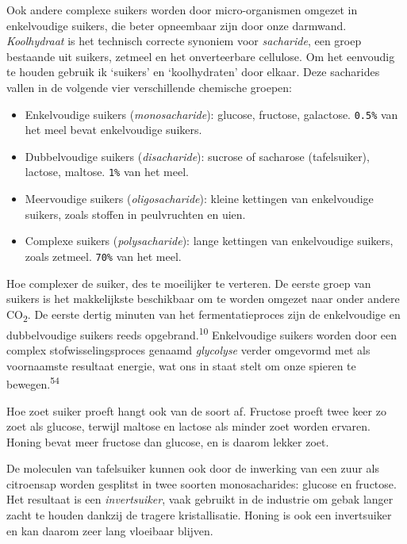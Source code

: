 \documentclass[
  11pt,
  dutch,
]{memoir}
\providecommand{\tightlist}{%
  \setlength{\itemsep}{0pt}\setlength{\parskip}{0pt}}
\begin{document}
Ook andere complexe suikers worden door micro-organismen omgezet in
enkelvoudige suikers, die beter opneembaar zijn door onze darmwand.
\emph{Koolhydraat} is het technisch correcte synoniem voor
\emph{sacharide}, een groep bestaande uit suikers, zetmeel en het
onverteerbare cellulose. Om het eenvoudig te houden gebruik ik `suikers'
en `koolhydraten' door elkaar. Deze sacharides vallen in de volgende
vier verschillende chemische groepen:

\label{microbio:suikers}

\begin{itemize}
\tightlist
\item
  Enkelvoudige suikers (\emph{monosacharide}): glucose, fructose,
  galactose. \texttt{0.5\%} van het meel bevat enkelvoudige suikers.
\item
  Dubbelvoudige suikers (\emph{disacharide}): sucrose of sacharose
  (tafelsuiker), lactose, maltose. \texttt{1\%} van het meel.
\item
  Meervoudige suikers (\emph{oligosacharide}): kleine kettingen van
  enkelvoudige suikers, zoals stoffen in peulvruchten en uien.
\item
  Complexe suikers (\emph{polysacharide}): lange kettingen van
  enkelvoudige suikers, zoals zetmeel. \texttt{70\%} van het meel.
\end{itemize}

Hoe complexer de suiker, des te moeilijker te verteren. De eerste groep
van suikers is het makkelijkste beschikbaar om te worden omgezet naar
onder andere CO\textsubscript{2}. De eerste dertig minuten van het
fermentatieproces zijn de enkelvoudige en dubbelvoudige suikers reeds
opgebrand.\textsuperscript{10} Enkelvoudige suikers worden door een
complex stofwisselingsproces genaamd \emph{glycolyse} verder omgevormd
met als voornaamste resultaat energie, wat ons in staat stelt om onze
spieren te bewegen.\textsuperscript{54}

Hoe zoet suiker proeft hangt ook van de soort af. Fructose proeft twee
keer zo zoet als glucose, terwijl maltose en lactose als minder zoet
worden ervaren. Honing bevat meer fructose dan glucose, en is daarom
lekker zoet.

De moleculen van tafelsuiker kunnen ook door de inwerking van een zuur
als citroensap worden gesplitst in twee soorten monosacharides: glucose
en fructose. Het resultaat is een \emph{invertsuiker}, vaak gebruikt in
de industrie om gebak langer zacht te houden dankzij de tragere
kristallisatie. Honing is ook een invertsuiker en kan daarom zeer lang
vloeibaar blijven.
\end{document}
